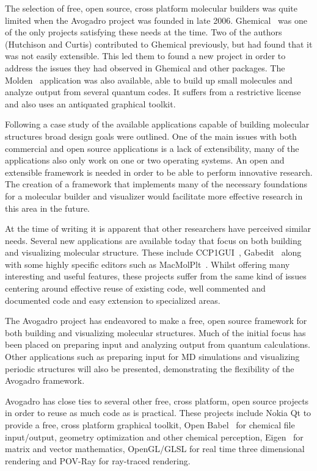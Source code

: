 \documentclass{article}
\begin{document}
The selection of free, open source, cross platform molecular builders was quite limited when the Avogadro project was founded in late 2006. Ghemical~\cite{Ghemical} was one of the only projects satisfying these needs at the time. Two of the authors (Hutchison and Curtis) contributed to Ghemical previously, but had found that it was not easily extensible. This led them to found a new project in order to address the issues they had observed in Ghemical and other packages. The Molden~\cite{Molden} application was also available, able to build up small molecules and analyze output from several quantum codes. It suffers from a restrictive license and also uses an antiquated graphical toolkit.

Following a case study of the available applications capable of building molecular structures broad design goals were outlined. One of the main issues with both commercial and open source applications is a lack of extensibility, many of the applications also only work on one or two operating systems. An open and extensible framework is needed in order to be able to perform innovative research. The creation of a framework that implements many of the necessary foundations for a molecular builder and visualizer would facilitate more effective research in this area in the future.

At the time of writing it is apparent that other researchers have perceived similar needs. Several new applications are available today that focus on both building and visualizing molecular structure. These include CCP1GUI~\cite{CCP1GUI}, Gabedit~\cite{Gabedit} along with some highly specific editors such as MacMolPlt~\cite{MacMolPlt}. Whilst offering many interesting and useful features, these projects suffer from the same kind of issues centering around effective reuse of existing code, well commented and documented code and easy extension to specialized areas.

The Avogadro project has endeavored to make a free, open source framework for both building and visualizing molecular structures. Much of the initial focus has been placed on preparing input and analyzing output from quantum calculations. Other applications such as preparing input for MD simulations and visualizing periodic structures will also be presented, demonstrating the flexibility of the Avogadro framework.

Avogadro has close ties to several other free, cross platform, open source projects in order to reuse as much code as is practical. These projects include Nokia Qt to provide a free, cross platform graphical toolkit, Open Babel~\cite{OpenBabel} for chemical file input/output, geometry optimization and other chemical perception, Eigen~\cite{Eigen} for matrix and vector mathematics, OpenGL/GLSL for real time three dimensional rendering and POV-Ray for ray-traced rendering.
\end{document}
